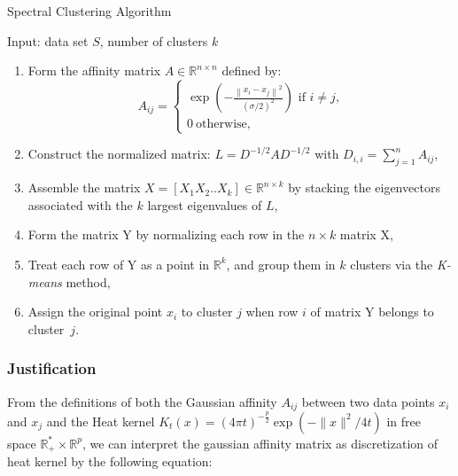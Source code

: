 \documentclass{llncs}
\begin{document}
\vspace{-0.5cm}
\begin{algorithm}
\caption{Spectral Clustering Algorithm}
Input: data set $S$, number of clusters $k$
\begin{enumerate}
  \item Form the affinity matrix $A\in\mathbb{R}^{n\times n}$ defined by:
    \begin{equation}
      A_{ij}=\begin{cases}
        \exp\left(-\frac{\left\|x_i-x_j\right\|^2}{(\sigma/2)^2}\right) \text{\  if $i\neq j$,}\\ \label{defaff}
        0 \ \text{otherwise,}
      \end{cases}
    \end{equation}
  \item Construct the normalized matrix: $L=D^{-1/2}AD^{-1/2}$ with $D_{i,i}=\sum_{j=1}^n A_{ij}$,
  \item Assemble the matrix $X=[X_1X_2..X_k]\in \mathbb{R}^{n\times k}$ by stacking the eigenvectors associated with the {$k$} largest eigenvalues of $L$,
  \item Form the matrix Y by normalizing each row in the $n \times k$ matrix X,
  \item Treat each row of Y as a point in $\mathbb{R}^{k}$, and group them in $k$ clusters via the {\it K-means} method,
  \item Assign the original point $x_i$ to cluster $j$ when row $i$ of matrix Y belongs to cluster~$j$. 
\end{enumerate}
\label{algoSC}
\end{algorithm}

\vspace{-1.0cm}

\subsubsection{Justification}

From the definitions of  both the Gaussian affinity $A_{ij}$ between two data
points $x_i$ and $x_j$ and the Heat kernel $K_t(x)=(4\pi
t)^{-\frac{p}{2}}\exp\left(-{\|x\|^2}/{4t}\right)$ in free space
$\mathbb{R}^*_+ \times \mathbb{R}^p$, we can interpret the gaussian affinity
matrix as discretization of heat kernel by the following equation:
\end{document}
